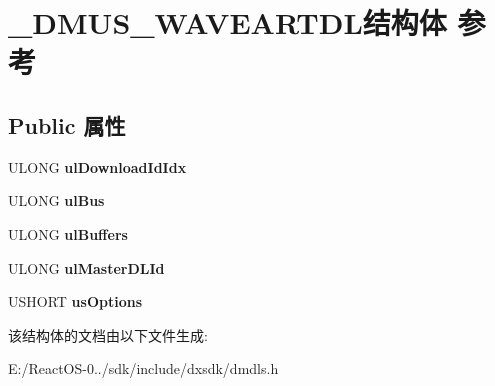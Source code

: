\hypertarget{struct___d_m_u_s___w_a_v_e_a_r_t_d_l}{}\section{\+\_\+\+D\+M\+U\+S\+\_\+\+W\+A\+V\+E\+A\+R\+T\+D\+L结构体 参考}
\label{struct___d_m_u_s___w_a_v_e_a_r_t_d_l}
\subsection*{Public 属性}
\begin{DoxyCompactItemize}
\item 
\mbox{\label{struct___d_m_u_s___w_a_v_e_a_r_t_d_l_ab974a935aff41fd93a72732fe7a1f0d2}} 
U\+L\+O\+NG {\bfseries ul\+Download\+Id\+Idx}
\item 
\mbox{\label{struct___d_m_u_s___w_a_v_e_a_r_t_d_l_a64b2777023faf5ce7907b5ddd9ba570f}} 
U\+L\+O\+NG {\bfseries ul\+Bus}
\item 
\mbox{\label{struct___d_m_u_s___w_a_v_e_a_r_t_d_l_af9491b3d5e8f7b7d2ff6a392bb047351}} 
U\+L\+O\+NG {\bfseries ul\+Buffers}
\item 
\mbox{\label{struct___d_m_u_s___w_a_v_e_a_r_t_d_l_ac3893aff01945623141e60d3a170c910}} 
U\+L\+O\+NG {\bfseries ul\+Master\+D\+L\+Id}
\item 
\mbox{\label{struct___d_m_u_s___w_a_v_e_a_r_t_d_l_a70b19fdcd820ea2c882550325e0be1a4}} 
U\+S\+H\+O\+RT {\bfseries us\+Options}
\end{DoxyCompactItemize}


该结构体的文档由以下文件生成\+:\begin{DoxyCompactItemize}
\item 
E\+:/\+React\+O\+S-\/0../sdk/include/dxsdk/dmdls.\+h\end{DoxyCompactItemize}

